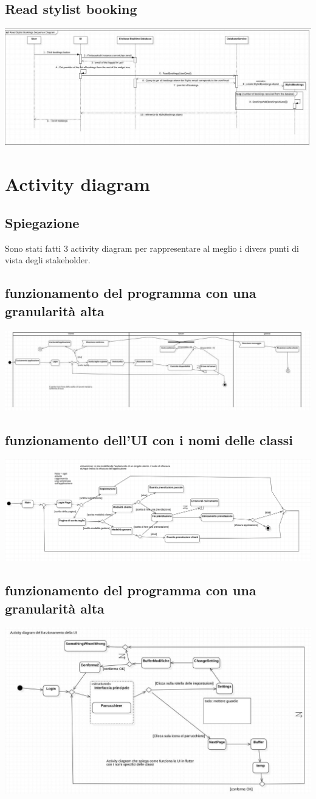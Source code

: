 \documentclass{article}
\begin{document}
\subsection{Read stylist booking}
\includegraphics[scale=0.40]{ImmaginiUML/Sequence3.jpg}

\newpage
\section{Activity diagram} 
\subsection{Spiegazione}
Sono stati fatti 3 activity diagram per rappresentare al meglio 
i divers punti di vista degli stakeholder.
\subsection{funzionamento del programma con una granularità alta}
\includegraphics[scale = 0.38]{ImmaginiUML/Activity1.jpg}
\subsection{funzionamento dell'UI con i nomi delle classi}
\includegraphics[scale = 0.45]{ImmaginiUML/Activity2.png}
\subsection{funzionamento del programma con una granularità alta}
\includegraphics[scale = 0.35]{ImmaginiUML/Activity3.jpg}
\end{document}
